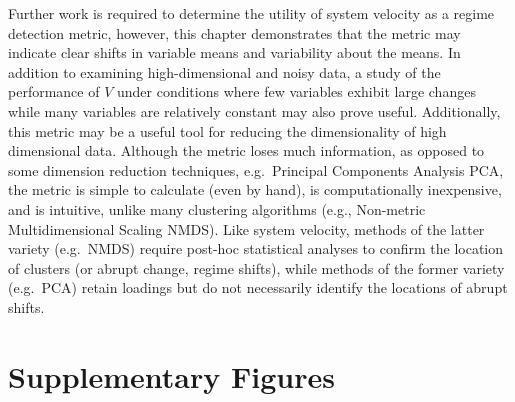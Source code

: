 \documentclass[12pt,twoside,openany]{reedthesis}
\begin{document}
Further work is required to determine the utility of system velocity as a regime detection metric, however, this chapter demonstrates that the metric may indicate clear shifts in variable means and variability about the means. In addition to examining high-dimensional and noisy data, a study of the performance of \(V\) under conditions where few variables exhibit large changes while many variables are relatively constant may also prove useful. Additionally, this metric may be a useful tool for reducing the dimensionality of high dimensional data. Although the metric loses much information, as opposed to some dimension reduction techniques, e.g.~Principal Components Analysis PCA, the metric is simple to calculate (even by hand), is computationally inexpensive, and is intuitive, unlike many clustering algorithms (e.g., Non-metric Multidimensional Scaling NMDS). Like system velocity, methods of the latter variety (e.g.~NMDS) require post-hoc statistical analyses to confirm the location of clusters (or abrupt change, regime shifts), while methods of the former variety (e.g.~PCA) retain loadings but do not necessarily identify the locations of abrupt shifts.

\hypertarget{supplementary-figures}{%
\section{Supplementary Figures}\label{supplementary-figures}}
\end{document}
